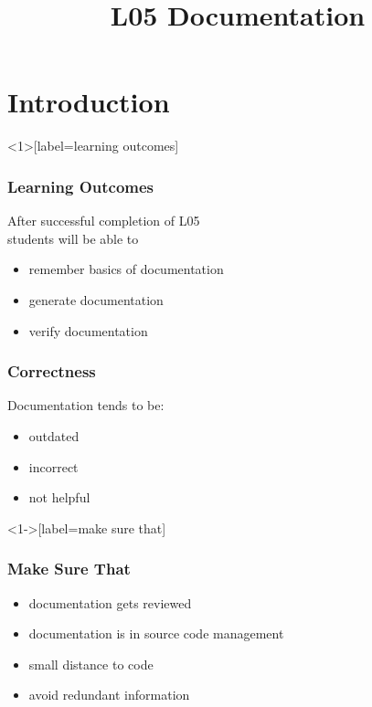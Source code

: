 

\title{L05 Documentation}



\section{Introduction}

\begin{frame}<1>[label=learning outcomes]
	\frametitle{Learning Outcomes}
	After successful completion of L05 \\
	students will be able to

	\begin{itemize}
	\item remember basics of documentation
	\item generate documentation
	\item verify documentation
	\end{itemize}
\end{frame}

\begin{frame}
	\frametitle{Correctness}

	Documentation tends to be:

	\begin{itemize}[<+-| alert@+>]
	\item outdated
	\item incorrect
	\item not helpful
	\end{itemize}
\end{frame}

\begin{frame}<1->[label=make sure that]
	\frametitle{Make Sure That}

	\begin{itemize}[<+-| alert@+>]
	\item documentation gets reviewed
	\item documentation is in source code management
	\item small distance to code
	\item avoid redundant information
	\end{itemize}
\end{frame}

